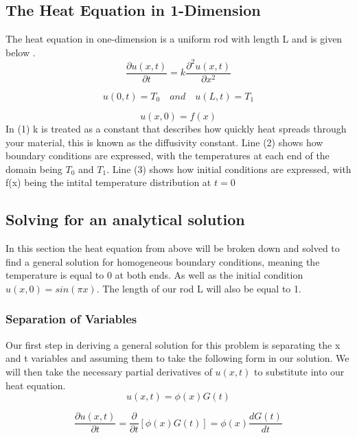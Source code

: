 \documentclass[12pt, reqno]{amsart}
\begin{document}
\subsection{The Heat Equation in 1-Dimension}
The heat equation in one-dimension is a uniform rod with length L and is given below
\cite{1}.
\begin{equation}\frac{\partial{u}(x,t)}{\partial{t}} = k\frac{\partial^2u(x,t)}{\partial{x^2}}
\end{equation}

\begin{equation} 
u(0,t) = T_0\quad and \quad u(L,t) = T_1
\end{equation}

\begin{equation}
u(x,0) = f(x)
\end{equation}In (1) k is treated as a constant that describes how quickly heat spreads through your material, this is known as the diffusivity constant. Line (2) shows how boundary conditions are expressed, with the temperatures at each end of the domain being $T_0$ and $T_1$. Line (3) shows how initial conditions are expressed, with f(x) being the intital temperature distribution at $t = 0$

\subsection{Solving for an analytical solution}
In this section the heat equation from above will be broken down and solved to find a general solution for homogeneous boundary conditions, meaning the temperature is equal to 0 at both ends. As well as the initial condition $u(x,0) = sin(\pi x)$. The length of our rod L will also be equal to 1.
\subsubsection{Separation of Variables}
Our first step in deriving a general solution for this problem is separating the x and t variables and assuming them to take the following form in our solution. We will then take the necessary partial derivatives of $u(x,t)$ to substitute into our heat equation.
\begin{equation*}
u(x,t) = \phi(x)G(t)
\end{equation*}

\begin{equation}
 \frac{\partial{u(x,t)}}{\partial{t}}= \frac{\partial}{\partial{t}}[\phi(x)G(t)] = \phi(x)\frac{dG(t)}{dt}
\end{equation}
\end{document}
